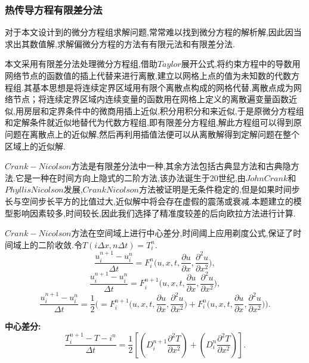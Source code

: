 \documentclass{whutmod}
\begin{document}
\subsubsection{热传导方程有限差分法}
对于本文设计到的微分方程组求解问题,常常难以找到微分方程的解析解,因此因当求出其数值解,求解偏微分方程的方法有有限元法和有限差分法.

本文采用有限差分法处理微分方程组,借助$Taylor$展开公式,将约束方程中的导数用网络节点的函数值的插上代替来进行离散,建立以网格上点的值为未知数的代数方程组.其基本思想是将连续定界区域用有限个离散点构成的网格代替,离散点成为网络节点；将连续定界区域内连续变量的函数用在网格上定义的离散遍变量函数近似,用房层和定界条件中的微商用插上近似,积分用积分和来近似,于是原微分方程组和定解条件就近似地替代为代数方程组,即有限差分方程组,解此方程组可以得到原问题在离散点上的近似解,然后再利用插值法便可以从离散解得到定解问题在整个区域上的近似解.

$Crank-Nicolson$方法是有限差分法中一种,其余方法包括古典显方法和古典隐方法.它是一种在时间方向上隐式的二阶方法,该办法诞生于20世纪,由$John Crank$和$Phyllis Nicolson$发展,$Crank Nicolson$方法被证明是无条件稳定的,但是如果时间步长与空间步长平方的比值过大,近似解中将会存在虚假的震荡或衰减.本题建立的模型影响因素较多,时间较长,因此我们选择了精准度较差的后向欧拉方法进行计算.

$Crank-Nicolson$方法在空间域上进行中心差分,时间阈上应用剃度公式,保证了时间域上的二阶收敛.令$T(i\Delta x,n\Delta t)=T_{i}^{n}$.
\begin{equation}
\frac{u_{i}^{n+1}-u_{i}^{n}}{\Delta t}=F_{i}^{n}\big(u,x,t,\frac{\partial u}{\partial x},\frac{\partial^{2}u}{\partial x^2}),
\end{equation}
\begin{equation}
\frac{u_{i}^{n+1}-u_{i}^{n}}{\Delta t}=F_{i}^{n+1}\big(u,x,t,\frac{\partial u}{\partial x},\frac{\partial^{2}u}{\partial x^2}),
\end{equation}
\begin{equation}
\frac{u_{i}^{n+1}-u_{i}^{n}}{\Delta t}=\frac{1}{2}\big(=F_{i}^{n+1}\big(u,x,t,\frac{\partial u}{\partial x},\frac{\partial^{2}u}{\partial x^2})+F_{i}^{n}\big(u,x,t,\frac{\partial u}{\partial x},\frac{\partial^{2}u}{\partial x^2})).
\end{equation}


\textbf{中心差分:}
\begin{equation}
\frac{T_{i}^{n+1}-T-{i}^n}{\Delta t}=\frac{1}{2}[(D_{i}^{n+1}\frac{\partial^{2}T}{\partial x^{2}})+(D_{i}^{n}\frac{\partial^{2}T}{\partial x^{2}})].
\end{equation}
\end{document}
